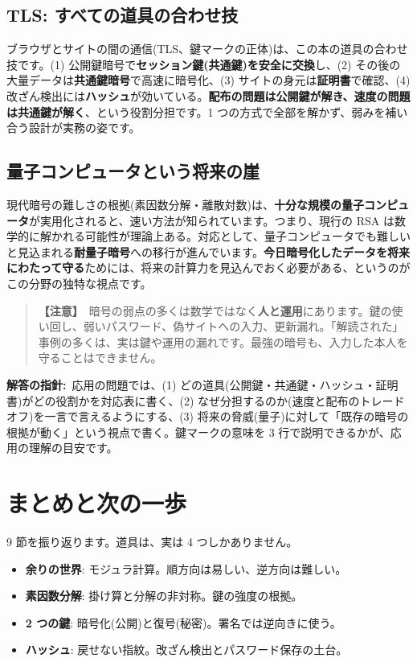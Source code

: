 \documentclass{article}
\begin{document}
\subsection{TLS: すべての道具の合わせ技}

ブラウザとサイトの間の通信(TLS、鍵マークの正体)は、この本の道具の合わせ技です。(1) 公開鍵暗号で\textbf{セッション鍵(共通鍵)を安全に交換}し、(2) その後の大量データは\textbf{共通鍵暗号}で高速に暗号化、(3) サイトの身元は\textbf{証明書}で確認、(4) 改ざん検出には\textbf{ハッシュ}が効いている。\textbf{配布の問題は公開鍵が解き、速度の問題は共通鍵が解く}、という役割分担です。1 つの方式で全部を解かず、弱みを補い合う設計が実務の姿です。

\subsection{量子コンピュータという将来の崖}

現代暗号の難しさの根拠(素因数分解・離散対数)は、\textbf{十分な規模の量子コンピュータ}が実用化されると、速い方法が知られています。つまり、現行の RSA は数学的に解かれる可能性が理論上ある。対応として、量子コンピュータでも難しいと見込まれる\textbf{耐量子暗号}への移行が進んでいます。\textbf{今日暗号化したデータを将来にわたって守る}ためには、将来の計算力を見込んでおく必要がある、というのがこの分野の独特な視点です。

\begin{quote}
\textbf{【注意】}\ 暗号の弱点の多くは数学ではなく\textbf{人と運用}にあります。鍵の使い回し、弱いパスワード、偽サイトへの入力、更新漏れ。「解読された」事例の多くは、実は鍵や運用の漏れです。最強の暗号も、入力した本人を守ることはできません。
\end{quote}

\textbf{解答の指針:}\ 応用の問題では、(1) どの道具(公開鍵・共通鍵・ハッシュ・証明書)がどの役割かを対応表に書く、(2) なぜ分担するのか(速度と配布のトレードオフ)を一言で言えるようにする、(3) 将来の脅威(量子)に対して「既存の暗号の根拠が動く」という視点で書く。鍵マークの意味を 3 行で説明できるかが、応用の理解の目安です。

\section{まとめと次の一歩}

9 節を振り返ります。道具は、実は 4 つしかありません。

\begin{itemize}
\item \textbf{余りの世界}: モジュラ計算。順方向は易しい、逆方向は難しい。
\item \textbf{素因数分解}: 掛け算と分解の非対称。鍵の強度の根拠。
\item \textbf{2 つの鍵}: 暗号化(公開)と復号(秘密)。署名では逆向きに使う。
\item \textbf{ハッシュ}: 戻せない指紋。改ざん検出とパスワード保存の土台。
\end{itemize}
\end{document}
